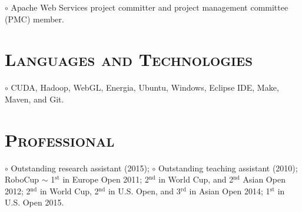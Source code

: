 \begin{resume}
\begin{position}
$\circ$  Apache Web Services project committer  and project management committee (PMC)  member.
\end{position}












\vspace{-2mm}
\section{\textsc{Languages and Technologies}}

\dates{~}
\begin{position}
$\circ$ CUDA, Hadoop, WebGL, Energia, Ubuntu, Windows, Eclipse IDE, Make, Maven, and
Git.
\end{position}

\vspace{-2mm}
\section{\textsc{Professional}}


\dates{~}
\begin{position}
$\circ$ Outstanding research assistant (2015); $\circ$ Outstanding teaching assistant (2010); RoboCup $\sim$ 1$^{\mbox{st}}$ in Europe Open 2011;  
2$^{\mbox{nd}}$ in World Cup, and 2$^{\mbox{nd}}$ Asian Open 2012; 2$^{\mbox{nd}}$ in World Cup, 
2$^{\mbox{nd}}$ in U.S. Open, and  3$^{\mbox{rd}}$ in Asian Open 2014; 1$^{\mbox{st}}$ in U.S. Open 
2015. 
\end{position}



\end{resume}
